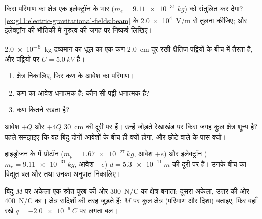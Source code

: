 \begin{exercise}[$\star\star$]\label{exo:g11:electric-gravitational-fields:7}
किस परिमाण का क्षेत्र एक इलेक्ट्रॉन के भार ($m_e = \qty{9.11e-31}{kg}$) को
संतुलित कर देगा? \cref{ex:g11:electric-gravitational-fields:beam} के \qty{2.0e4}{V/m} से तुलना कीजिए; और इलेक्ट्रॉन की भौतिकी
में गुरुत्व की जगह पर निष्कर्ष लिखिए।
\end{exercise}

\begin{exercise}[$\star\star$]\label{exo:g11:electric-gravitational-fields:8}
\qty{2.0e-6}{kg} द्रव्यमान का धूल का एक कण \qty{2.0}{cm} दूर रखी क्षैतिज पट्टियों के बीच
 में तैरता है, और पट्टियों पर $U = \qty{5.0}{kV}$ है।
\begin{enumerate}
  \item क्षेत्र निकालिए, फिर कण के आवेश का परिमाण।
  \item कण का आवेश धनात्मक है: कौन-सी पट्टी धनात्मक है?
  \item कण कितने  रखता है?
\end{enumerate}
\end{exercise}

\begin{exercise}[$\star\star$]\label{exo:g11:electric-gravitational-fields:9}
आवेश $+Q$ और $+4Q$ \qty{30}{cm} की दूरी पर हैं। उन्हें जोड़ते रेखाखंड पर
किस जगह कुल क्षेत्र शून्य है? पहले समझाइए कि वह बिंदु दोनों आवेशों
के बीच ही क्यों होगा, और छोटे वाले के पास क्यों।
\end{exercise}

\begin{exercise}[$\star\star$]\label{exo:g11:electric-gravitational-fields:10}
हाइड्रोजन के  में प्रोटॉन ($m_p = \qty{1.67e-27}{kg}$, आवेश $+e$) और
इलेक्ट्रॉन ($m_e = \qty{9.11e-31}{kg}$, आवेश $-e$) $d = \qty{5.3e-11}{m}$ की दूरी पर हैं। उनके बीच का
विद्युत बल और  तथा उनका अनुपात निकालिए।
\end{exercise}

\begin{exercise}[$\star\star$]\label{exo:g11:electric-gravitational-fields:11}
बिंदु $M$ पर अकेला एक स्रोत पूरब की ओर \qty{300}{N/C} का क्षेत्र
बनाता; दूसरा अकेला, उत्तर की ओर \qty{400}{N/C} का। क्षेत्र सदिशों की तरह
जुड़ते हैं: $M$ पर कुल क्षेत्र (परिमाण और दिशा) बताइए, फिर वहाँ
रखे $q = \qty{-2.0e-6}{C}$ पर लगता बल।
\end{exercise}

